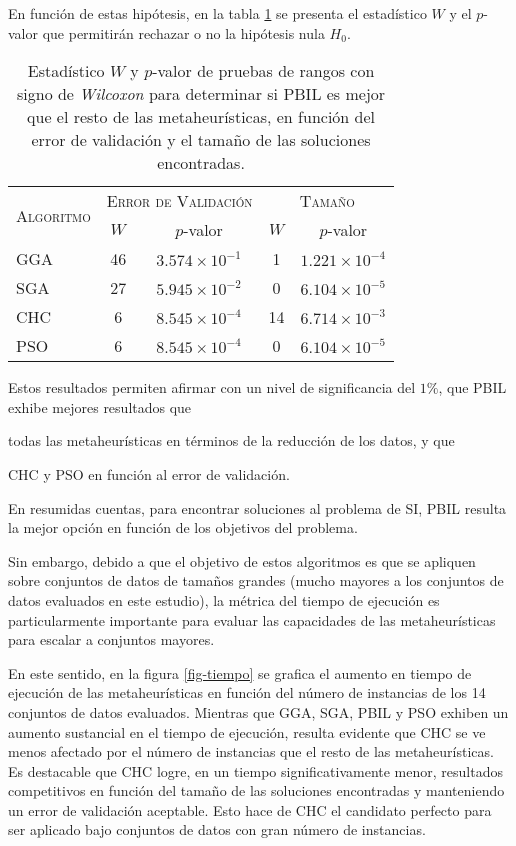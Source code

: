 En función de estas hipótesis, en la tabla \ref{wilcox-res-pbil} se presenta el estadístico $W$ y el $p$-valor que permitirán rechazar o no la hipótesis nula $H_0$.

\begin{table}[h!]
\centering
\begin{tabular}{l c c c c}
\hline
\multirow{2}{*}{\textsc{Algoritmo}}
	& \multicolumn{2}{c}{\textsc{Error de Validación}}
	& \multicolumn{2}{c}{\textsc{Tamaño}} \\\cline{2-5}
 & $W$ & $p$-valor & $W$ & $p$-valor \\
\hline
\hline
GGA & 46 & $3.574 \times 10^{-1}$ &  1 & $1.221 \times 10^{-4}$ \\
SGA & 27 & $5.945 \times 10^{-2}$ &  0 & $6.104 \times 10^{-5}$ \\
CHC &  6 & $8.545 \times 10^{-4}$ & 14 & $6.714 \times 10^{-3}$ \\
PSO &  6 & $8.545 \times 10^{-4}$ &  0 & $6.104 \times 10^{-5}$ \\
\hline
\end{tabular}
\caption[Pruebas de \emph{Wilcoxon} entre PBIL y las demás metaheurísticas]{Estadístico $W$ y $p$-valor de pruebas de rangos con signo de \emph{Wilcoxon} para determinar si PBIL es mejor que el resto de las metaheurísticas, en función del error de validación y el tamaño de las soluciones encontradas.}
\label{wilcox-res-pbil}
\end{table}

Estos resultados permiten afirmar con un nivel de significancia del $1\%$, que PBIL exhibe mejores resultados que
\begin{inparaenum}
\item todas las metaheurísticas en términos de la reducción de los datos, y que
\item CHC y PSO en función al error de validación.
\end{inparaenum}
En resumidas cuentas, para encontrar soluciones al problema de SI, PBIL resulta la mejor opción en función de los objetivos del problema.

Sin embargo, debido a que el objetivo de estos algoritmos es que se apliquen sobre conjuntos de datos de tamaños grandes (mucho mayores a los conjuntos de datos evaluados en este estudio), la métrica del tiempo de ejecución es particularmente importante para evaluar las capacidades de las metaheurísticas para escalar a conjuntos mayores.

En este sentido, en la figura \ref{fig-tiempo} se grafica el aumento en tiempo de ejecución de las metaheurísticas en función del número de instancias de los 14 conjuntos de datos evaluados. Mientras que GGA, SGA, PBIL y PSO exhiben un aumento sustancial en el tiempo de ejecución, resulta evidente que CHC se ve menos afectado por el número de instancias que el resto de las metaheurísticas. Es destacable que CHC logre, en un tiempo significativamente menor, resultados competitivos en función del tamaño de las soluciones encontradas y manteniendo un error de validación aceptable. Esto hace de CHC el candidato perfecto para ser aplicado bajo conjuntos de datos con gran número de instancias.

